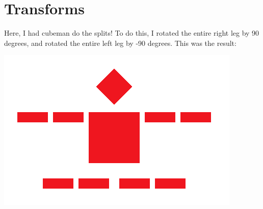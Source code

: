 \documentclass{article}
\begin{document}
\section{Transforms}
Here, I had cubeman do the splits! To do this, I rotated the entire right leg by 90 degrees, and rotated the entire left leg by -90 degrees. This was the result:
\begin{center}
    \includegraphics[]{task 3/image.png}
\end{center}
\end{document}
